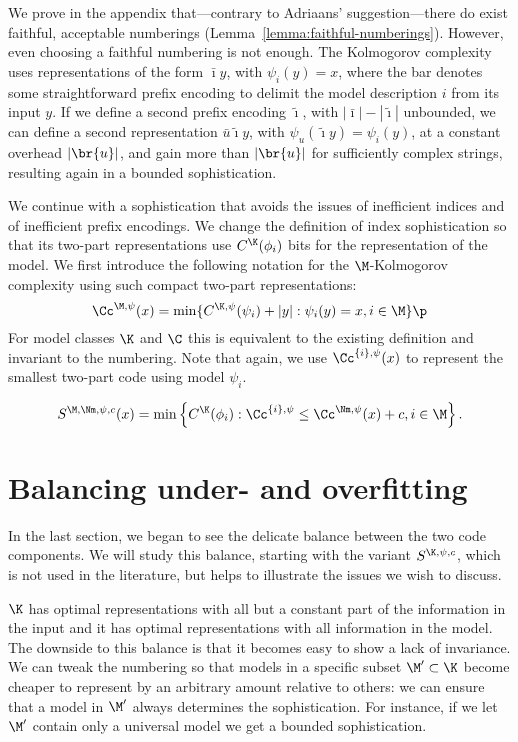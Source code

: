We prove in the appendix that---contrary to Adriaans' suggestion---there do exist faithful, acceptable numberings (Lemma~\ref{lemma:faithful-numberings}). However, even choosing a faithful numbering is not enough. The Kolmogorov complexity uses representations of the form $\bar\imath y$, with $\psi_i(y) = x$,  where the bar denotes some straightforward prefix encoding to delimit the model description $i$ from its input $y$. If we define a second prefix encoding $\tilde{\imath}$, with $|\bar\imath|-|\tilde\imath|$ unbounded, we can define a second representation $\bar u \tilde \imath y$, with $\psi_u(\tilde{\imath} y) = \psi_i(y)$, at a constant overhead $|\br{u}|$, and gain more than $|\br{u}|$ for sufficiently complex strings, resulting again in a bounded sophistication.

We continue with a sophistication that avoids the issues of inefficient indices and of inefficient prefix encodings. We change the definition of index sophistication so that its two-part representations use $C^\K(\phi_i)$ bits for the representation of the model. We first introduce the following notation for the $\M$-Kolmogorov complexity using such compact two-part representations:
\[
\Cc^{\M, \psi}(x) = \min\{ C^{\K, \psi}(\psi_i) + |y| :  \psi_i(y) = x, i \in \M\}\p
\]
For model classes $\K$ and $\C$ this is equivalent to the existing definition and invariant to the numbering. Note that again, we use $\Cc^{\{i\}, \psi}(x)$ to represent the smallest two-part code using model $\psi_i$.

\begin{definition}[Sophistication]
\[
S^{\M,\Nm,\psi,c}(x)=\min\left\{C^\K(\phi_i): \Cc^{\{i\}, \psi} \le \Cc^{\Nm,\psi}(x)+c, i\in\M\right\}.
\]
\end{definition}

\section{Balancing under- and overfitting}
\label{section:balance}

In the last section, we began to see the delicate balance between the two code components. We will study this balance, starting with the variant $S^{\K,\psi,c}$, which is not used in the literature, but helps to illustrate the issues we wish to discuss.

$\K$ has optimal representations with all but a constant part of the information in the input and it has optimal representations with all information in the model. The downside to this balance is that it becomes easy to show a lack of invariance. We can tweak the numbering so that models in a specific subset $\M'\subset\K$ become cheaper to represent by an arbitrary amount relative to others: we can ensure that a model in $\M'$ always determines the sophistication. For instance, if we let $\M'$ contain only a universal model we get a bounded sophistication.

